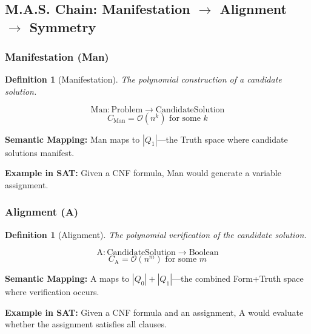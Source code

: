 \documentclass[11pt, letterpaper]{article}
\newtheorem{definition}[theorem]{Definition}
\begin{document}
\subsection{\texorpdfstring{M.A.S. Chain: Manifestation $\rightarrow$ Alignment $\rightarrow$ Symmetry}{M.A.S. Chain: Manifestation -- Alignment -- Symmetry}}

\subsubsection{Manifestation (Man)}

\begin{definition}[Manifestation]
The polynomial construction of a candidate solution.

\begin{equation}
\text{Man}: \text{Problem} \rightarrow \text{CandidateSolution}
\end{equation}
\begin{equation}
C_{\text{Man}} = \mathcal{O}(n^k) \text{ for some } k
\end{equation}
\end{definition}

\textbf{Semantic Mapping:} Man maps to $|Q_1|$—the Truth space where candidate solutions manifest.

\textbf{Example in SAT:} Given a CNF formula, Man would generate a variable assignment.

\subsubsection{Alignment (A)}

\begin{definition}[Alignment]
The polynomial verification of the candidate solution.

\begin{equation}
\text{A}: \text{CandidateSolution} \rightarrow \text{Boolean}
\end{equation}
\begin{equation}
C_{\text{A}} = \mathcal{O}(n^m) \text{ for some } m
\end{equation}
\end{definition}

\textbf{Semantic Mapping:} A maps to $|Q_0| + |Q_1|$—the combined Form+Truth space where verification occurs.

\textbf{Example in SAT:} Given a CNF formula and an assignment, A would evaluate whether the assignment satisfies all clauses.
\end{document}
